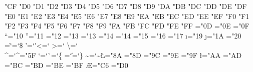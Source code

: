 \catcode"CF \CatLetter%
\catcode"D0 \CatLetter%
\catcode"D1 \CatLetter%
\catcode"D2 \CatLetter%
\catcode"D3 \CatLetter%
\catcode"D4 \CatLetter%
\catcode"D5 \CatLetter%
\catcode"D6 \CatLetter%
\catcode"D7 \CatLetter%
\catcode"D8 \CatLetter%
\catcode"D9 \CatLetter%
\catcode"DA \CatLetter%
\catcode"DB \CatLetter%
\catcode"DC \CatLetter%
\catcode"DD \CatLetter%
\catcode"DE \CatLetter%
\catcode"DF \CatLetter%
\catcode"E0 \CatLetter%
\catcode"E1 \CatLetter%
\catcode"E2 \CatLetter%
\catcode"E3 \CatLetter%
\catcode"E4 \CatLetter%
\catcode"E5 \CatLetter%
\catcode"E6 \CatLetter%
\catcode"E7 \CatLetter%
\catcode"E8 \CatLetter%
\catcode"E9 \CatLetter%
\catcode"EA \CatLetter%
\catcode"EB \CatLetter%
\catcode"EC \CatLetter%
\catcode"ED \CatLetter%
\catcode"EE \CatLetter%
\catcode"EF \CatLetter%
\catcode"F0 \CatLetter%
\catcode"F1 \CatLetter%
\catcode"F2 \CatLetter%
\catcode"F3 \CatLetter%
\catcode"F4 \CatLetter%
\catcode"F5 \CatLetter%
\catcode"F6 \CatLetter%
\catcode"F7 \CatLetter%
\catcode"F8 \CatLetter%
\catcode"F9 \CatLetter%
\catcode"FA \CatLetter%
\catcode"FB \CatLetter%
\catcode"FC \CatLetter%
\catcode"FD \CatLetter%
\catcode"FE \CatLetter%
\catcode"FF \CatLetter%
%
\chardef\quotesinglbase="0D%
\chardef\guilsinglleft="0E%
\chardef\guilsinglright="0F%
\chardef\textquotedblleft="10%
\chardef\textquotedblright="11%
\chardef\quotedblbase="12%
\chardef\guillemetleft="13%
\chardef\guillemotleft="13%
\chardef\guillemetright="14%
\chardef\guillemotright="14%
\chardef\textendash="15%
\chardef\textemdash="16%
\chardef\textcompwordmark="17%
\chardef\i="19%
\chardef\j="1A%
\chardef\textvisiblespace="20%
\chardef\textquotedbl=`\"%
\chardef\textdollar=`\$%
\chardef\textquoteright=`\'%
\chardef\textless=`\<%
\chardef\textgreater=`\>%
\chardef\textbackslash=`\\%
\chardef\textasciicircum=`\^%
\chardef\textunderscore="5F%
\chardef\textquoteleft=`\`%
\chardef\textbraceleft=`\{%
\chardef\textbar=`\|%
\chardef\textbraceright=`\}%
\chardef\textasciitilde=`\~%
\chardef\L="8A%
\chardef\NG="8D%
\chardef\IJ="9C%
\chardef\dj="9E%
\chardef\textsection="9F%
\chardef\l="AA%
\chardef\ng="AD%
\chardef\ij="BC%
\chardef\textexclamdown="BD%
\chardef\textquestiondown="BE%
\chardef\textsterling="BF%
\chardef\AE="C6%
\chardef\DH="D0%
